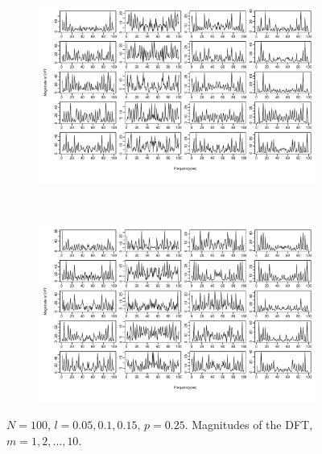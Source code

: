 \documentclass[11pt, a4paper]{article} %
\begin{document}
\begin{figure}
\begin{subfigure}{1.1\textwidth}
  \centering
  \includegraphics[width=\linewidth]{N100_MagnDFT_p025_l005001015_m_1_5.pdf}
  \label{fig:sfig1}
\end{subfigure}\\
\begin{subfigure}{1.1\textwidth}
  \centering
  \includegraphics[width=\linewidth]{N100_MagnDFT_p025_l005001015_m_6_10.pdf}
  \label{fig:sfig2}
\end{subfigure}
\label{fig1}
\caption{$N = 100$, $l = 0.05, 0.1, 0.15$, $p = 0.25$. Magnitudes of the DFT, $m = 1,2, \dots, 10$.}
\end{figure}

\restoregeometry


\end{document}
